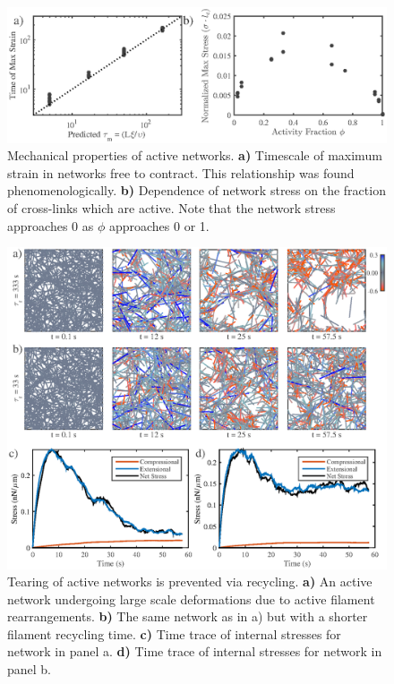 \begin{figure}[h!]
\centering
\includegraphics[width=\hsize]{active/figures/figure4S}
\caption{\label{fig:active_supp}  Mechanical properties of active networks.  \textbf{a)}  Timescale of maximum strain in networks free to contract.  This relationship was found phenomenologically.  \textbf{b)}  Dependence of network stress on the fraction of cross-links which are active.  Note that the network stress approaches 0 as $\phi$ approaches 0 or 1.}
\end{figure}

\begin{figure}[h!]
\centering
\includegraphics[width=\hsize]{active/figures/figure5_tear}
\caption{\label{fig:active_supp}  Tearing of active networks is prevented via recycling.  \textbf{a)}  An active network undergoing large scale deformations due to active filament rearrangements.  \textbf{b)}  The same network as in a) but with a shorter filament recycling time.  \textbf{c)}  Time trace of internal stresses for network in panel a.  \textbf{d)}   Time trace of internal stresses for network in panel b.  }
\end{figure}

